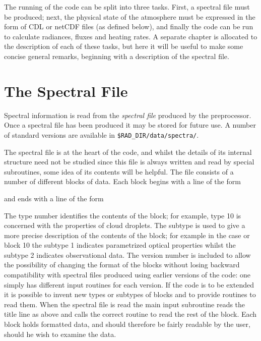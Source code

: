 The running of the code can be split into three tasks. First, a spectral 
file must be produced; next, the physical state of the atmosphere must be 
expressed in the form of CDL or netCDF files (as defined below), and finally 
the code can be run to calculate radiances, fluxes and heating rates. A separate
chapter is allocated to the description of each of these tasks, but here
it will be useful to make some concise general remarks, beginning
with a description of the spectral file.

\section{The Spectral File}

Spectral information is read from the {\em spectral file} produced by the
preprocessor. Once a spectral file has been produced it may be stored for
future use. A number of standard versions are available in {\tt \$RAD\_DIR/data/spectra/}.

The spectral file is at the heart of the code, and whilst the details of 
its internal
structure need not be studied since this file is always written and read by
special subroutines, some idea of its contents will be helpful.
The file consists of a number of different blocks of data. Each block
begins with a line of the form

\begin{flushleft}
\hspace*{.5in}{\tt *BLOCK: TYPE =    $n_1$: SUBTYPE =     $n_2$: VERSION =     $n_3$}
\end{flushleft}

and ends with a line of the form

\begin{flushleft}
\hspace*{.5in}{\tt *END}
\end{flushleft}

The type number identifies the contents of the block; for example, type 10
is concerned with the properties of cloud droplets. The subtype is used to
give a more precise description of the contents of the block; for example
in the case or block 10 the subtype 1 indicates parametrized optical
properties whilst the subtype 2 indicates observational data. The version
number is included to allow the possibility of changing the format of
the blocks without losing backward compatibility with spectral files
produced using earlier versions of the code: one simply has different
input routines for each version. If the code is to be extended it is
possible to invent new types or subtypes of blocks and to provide routines
to read them. When the spectral file is read the main input subroutine
reads the title line as above and calls the correct routine to read the
rest of the block. Each block holds formatted data, and should therefore
be fairly readable by the user, should he wish to examine the data.


